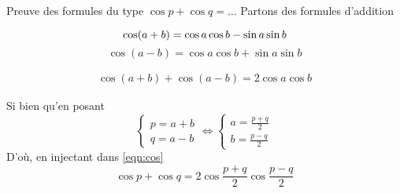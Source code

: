 \documentclass{article}
\begin{document}
\begin{question_kholle}{Preuve des formules du type $\cos p + \cos q = \dots$}
    Partons des formules d'addition
    
    $$
    \cos (a+b) = \cos a\cos b-\sin a\sin b\\
    $$
    $$
    \cos (a-b) = \cos a\cos b+\sin a\sin b
    $$
    
    \begin{align*}        
        \cos(a+b) + \cos (a-b) = 2\cos a\cos b 
        \tag{$\spadesuit$}\label{eqn:cos}
    \end{align*}
    
    
    Si bien qu'en posant
    $$
    \left\{ \begin{array}{ll}
        p = a+b \\
        q= a-b 
    \end{array}\right.
    \iff
    \left\{ \begin{array}{ll}
        a = \frac{p+q}{2} \\
        b= \frac{p-q}{2} 
    \end{array}\right.
    $$
    D'où, en injectant dans \eqref{eqn:cos}
    $$
    \cos p + \cos q = 2\cos \frac{p+q}{2} \cos \frac{p-q}{2}
    $$
    
\end{question_kholle}
\end{document}
